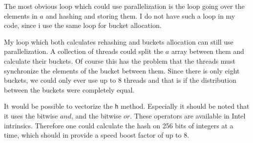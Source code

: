 The most obvious loop which could use parallelization is the loop going over the elements in $a$ and hashing and storing them. I do not have such a loop in my code, since i use the same loop for bucket allocation. 

My loop which both calculates rehashing and buckets allocation can still use parallelization. A collection of threads could split the $a$ array between them and calculate their buckets. Of course this has the problem that the threads must synchronize the elements of the bucket between them. Since there is only eight buckets, we could only ever use up to 8 threads and that is if the distribution between the buckets were completely equal.

\newpar It would be possible to vectorize the \texttt{h} method. Especially it should be noted that it uses the bitwise $and$, and the bitwise $or$. These operators are available in Intel intrinsics. Therefore one could calculate the hash on 256 bits of integers at a time, which should in provide a speed boost factor of up to 8.